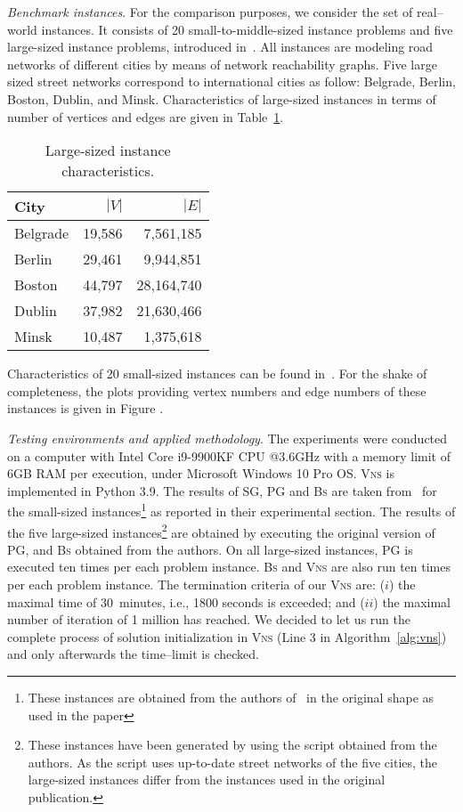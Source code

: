 \documentclass[dvipsnames,format=sigconf,anonymous=true,review=true]{acmart}
\begin{document}
\emph{Benchmark instances}. For the comparison purposes, we consider the set of real--world instances. It consists of 20 small-to-middle-sized instance problems and five large-sized instance problems, introduced in~\cite{corcoran2021heuristics}. All instances are  modeling road networks of different cities by means of network reachability graphs. Five large sized street networks correspond to international cities as follow: Belgrade, Berlin, Boston, Dublin, and Minsk.
 Characteristics of large-sized instances in terms of number of vertices and edges are given in Table~\ref{tab:big_instances_chars}. 
 
 \begin{table}
 	\caption{Large-sized instance characteristics.}
 	\label{tab:big_instances_chars}  
 	\begin{tabular}{lrr}
 		City      & $|V|$ & $|E|$ \\ \hline
 		Belgrade      & 19,586 & 7,561,185  \\ 
 		Berlin        & 29,461 & 9,944,851 \\
 	    Boston        & 44,797 & 28,164,740 \\
 	    Dublin        & 37,982 & 21,630,466 \\
 	    Minsk         & 10,487 & 1,375,618 \\ \hline
 	\end{tabular}
 \end{table}
 
 Characteristics of 20 small-sized instances can be found in~\cite{corcoran2021heuristics}. For the shake of completeness, the plots providing vertex numbers and edge numbers of these instances is given in Figure .  
 
 
 \emph{Testing environments and applied methodology}. The experiments were conducted  on a computer with Intel Core i9-9900KF CPU @3.6GHz with a memory limit of 6GB RAM per execution, under Microsoft Windows 10 Pro OS. \textsc{Vns}  is implemented in Python 3.9. The results of \textsc{SG}, \textsc{PG} and \textsc{Bs} are taken from~\cite{corcoran2021heuristics} for the small-sized instances\footnote{These instances are obtained from the authors of~\cite{corcoran2021heuristics} in the original shape as used in the paper} as reported in their experimental section. The results of the  five large-sized instances\footnote{These instances have been generated by using the script obtained from the authors. As the script uses up-to-date street networks of the five cities, the large-sized instances differ from the instances used in the original publication. } are obtained by executing the original version of \textsc{PG}, and \textsc{Bs} obtained from the authors. On all large-sized instances,  \textsc{PG} is executed ten times per each problem instance. \textsc{Bs} and \textsc{Vns} are also run ten times per each problem instance.  The termination criteria of our \textsc{Vns} are: ($i$) the maximal time of 30~minutes, i.e., 1800 seconds is exceeded; and ($ii$) the maximal number of iteration of 1 million has reached. We decided to let us run the complete process of solution initialization in \textsc{Vns} (Line 3 in Algorithm~\ref{alg:vns})  and only afterwards the time--limit is checked. 
\end{document}
